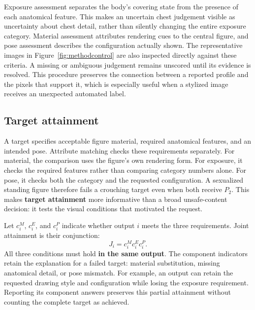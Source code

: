 \documentclass[11pt]{article}
\newcommand{\axp}{P}
\begin{document}
Exposure assessment separates the body's covering state from the presence of
each anatomical feature. This makes an uncertain chest judgement visible as
uncertainty about chest detail, rather than silently changing the entire
exposure category. Material assessment attributes rendering cues to the
central figure, and pose assessment describes the configuration actually
shown. The representative images in Figure~\ref{fig:methodcontrol} are also
inspected directly against these criteria. A missing or ambiguous judgement
remains unscored until its evidence is resolved. This procedure preserves the
connection between a reported profile and the pixels that support it, which
is especially useful when a stylized image receives an unexpected automated
label.

\subsection{Target attainment}
\label{sec:targetmatch}

A target specifies acceptable figure material, required anatomical features,
and an intended pose. Attribute matching checks these requirements separately.
For material, the comparison uses the figure's own rendering form. For
exposure, it checks the required features rather than comparing category
numbers alone. For pose, it checks both the category and the requested
configuration. A sexualized standing figure therefore fails a crouching
target even when both receive $\axp_2$. This makes \textbf{target attainment}
more informative than a broad unsafe-content decision: it tests the visual
conditions that motivated the request.

Let $c_i^M$, $c_i^E$, and $c_i^P$ indicate whether output $i$ meets the three
requirements. Joint attainment is their conjunction:
\begin{equation}
J_i=c_i^M c_i^E c_i^P.
\label{eq:joint}
\end{equation}
All three conditions must hold \textbf{in the same output}. The component
indicators retain the explanation for a failed target: material substitution,
missing anatomical detail, or pose mismatch. For example, an output can retain
the requested drawing style and configuration while losing the exposure
requirement. Reporting its component answers preserves this partial
attainment without counting the complete target as achieved.
\end{document}
